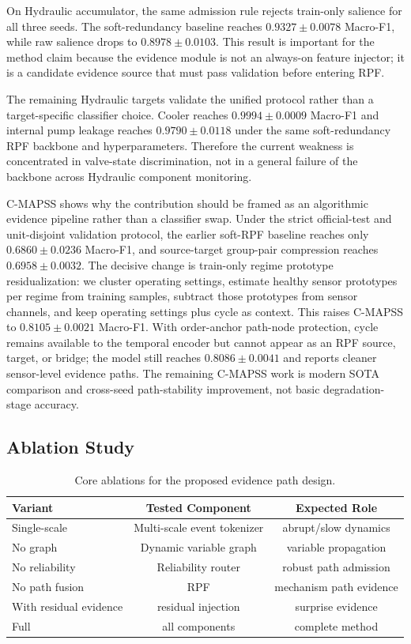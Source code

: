 \documentclass[letterpaper]{article}
\begin{document}
On Hydraulic accumulator, the same admission rule rejects train-only salience for all three seeds. The soft-redundancy baseline reaches \(0.9327{\pm}0.0078\) Macro-F1, while raw salience drops to \(0.8978{\pm}0.0103\). This result is important for the method claim because the evidence module is not an always-on feature injector; it is a candidate evidence source that must pass validation before entering RPF.

The remaining Hydraulic targets validate the unified protocol rather than a target-specific classifier choice. Cooler reaches \(0.9994{\pm}0.0009\) Macro-F1 and internal pump leakage reaches \(0.9790{\pm}0.0118\) under the same soft-redundancy RPF backbone and hyperparameters. Therefore the current weakness is concentrated in valve-state discrimination, not in a general failure of the backbone across Hydraulic component monitoring.

C-MAPSS shows why the contribution should be framed as an algorithmic evidence pipeline rather than a classifier swap. Under the strict official-test and unit-disjoint validation protocol, the earlier soft-RPF baseline reaches only \(0.6860{\pm}0.0236\) Macro-F1, and source-target group-pair compression reaches \(0.6958{\pm}0.0032\). The decisive change is train-only regime prototype residualization: we cluster operating settings, estimate healthy sensor prototypes per regime from training samples, subtract those prototypes from sensor channels, and keep operating settings plus cycle as context. This raises C-MAPSS to \(0.8105{\pm}0.0021\) Macro-F1. With order-anchor path-node protection, cycle remains available to the temporal encoder but cannot appear as an RPF source, target, or bridge; the model still reaches \(0.8086{\pm}0.0041\) and reports cleaner sensor-level evidence paths. The remaining C-MAPSS work is modern SOTA comparison and cross-seed path-stability improvement, not basic degradation-stage accuracy.

\subsection{Ablation Study}

\begin{table}[t]
\centering
\caption{Core ablations for the proposed evidence path design.}
\begin{tabular}{lcc}
\toprule
Variant & Tested Component & Expected Role \\
\midrule
Single-scale & Multi-scale event tokenizer & abrupt/slow dynamics \\
No graph & Dynamic variable graph & variable propagation \\
No reliability & Reliability router & robust path admission \\
No path fusion & RPF & mechanism path evidence \\
With residual evidence & residual injection & surprise evidence \\
Full & all components & complete method \\
\bottomrule
\end{tabular}
\end{table}
\end{document}

